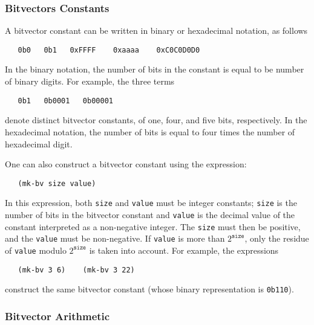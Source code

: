 \documentclass[11pt,twoside,fleqn,openright,titlepage]{cslreport}
\begin{document}
\subsubsection*{Bitvectors Constants}

A bitvector constant can be written in binary or hexadecimal notation, as follows
\begin{small}
\begin{verbatim}
   0b0   0b1   0xFFFF    0xaaaa    0xC0C0D0D0
\end{verbatim}
\end{small}
In the binary notation, the number of bits in the constant is equal to
be number of binary digits. For example, the three terms
\begin{small}
\begin{verbatim}
   0b1   0b0001   0b00001
\end{verbatim}
\end{small}
denote distinct bitvector constants, of one, four, and five bits, respectively.
In the hexadecimal notation, the number of bits is equal to four times the number
of hexadecimal digit.

\medskip\noindent
One can also construct a bitvector constant using the expression:
\begin{small}
\begin{verbatim}
   (mk-bv size value)
\end{verbatim}
\end{small}
In this expression, both \texttt{size} and \texttt{value} must be
integer constants; \texttt{size} is the number of bits in the
bitvector constant and \texttt{value} is the decimal value of the
constant interpreted as a non-negative integer. The \texttt{size}
must then be positive, and the \texttt{value} must be
non-negative. If \texttt{value} is more than $2^{\mathtt{size}}$,
only the residue of \texttt{value} modulo $2^{\mathtt{size}}$ is
taken into account. For example, the expressions
\begin{small}
\begin{verbatim}
   (mk-bv 3 6)    (mk-bv 3 22)
\end{verbatim}
\end{small}
construct the same bitvector constant (whose binary representation is
\texttt{0b110}).

\subsubsection*{Bitvector Arithmetic}
\end{document}
